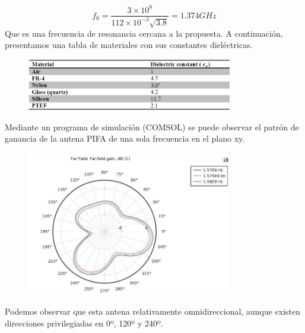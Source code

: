 \documentclass[a4paper,11pt,titlepage]{article}
\begin{document}
$$f_0=\frac{3\times 10^{8}}{112\times 10^{-3}\sqrt{3.8}}=1.374 GHz$$
Que es una frecuencia de resonancia cercana a la propuesta.
A continuación, presentamos una tabla de materiales con sus constantes dieléctricas.
\begin{figure}[H]
\centering
\includegraphics[width=0.8\textwidth]{materiales}
\end{figure}
Mediante un programa de simulación (COMSOL) se puede observar el patrón de ganancia de la antena PIFA de una sola frecuencia en el plano xy.
\begin{figure}[H]
\centering
\includegraphics[width=0.8\textwidth]{ganancia}
\end{figure}
Podemos observar que esta antena relativamente omnidireccional, aunque existen direcciones privilegiadas en 0º, 120º y 240º.
\end{document}
